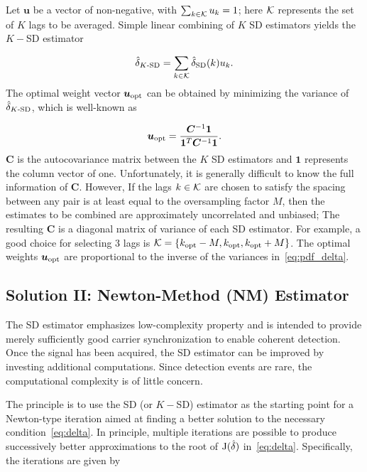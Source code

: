 Let $\bm{u}$ be a vector of non-negative, with
$\sum_{k \in {\cal K}}u_k=1$; here ${\cal K}$ represents the set of $K$
lags to be averaged.
Simple linear combining of $K$ SD estimators yields the $K-$SD estimator

\begin{equation}
  \label{eq:K_SD_est}
      \hat{\delta}_{K\text{-SD}}=\sum_{k \in \cal K}\hat{\delta}_{\text{SD}}(k)u_k.
\end{equation}
The optimal weight vector $\bm{u}_{\text{opt}}$ can be obtained by minimizing the variance of $\hat{\delta}_{K\text{-SD}}$,
which is well-known as

\begin{equation}
  \label{eq:u_opt}
      \bm{u}_{\text{opt}}=\frac{\bm{C}^{-1}\bm{1}}{\bm{1}^T\bm{C}^{-1}\bm{1}}.
\end{equation}
$\bm{C}$ is the autocovariance matrix between the $K$ SD estimators and $\bm{1}$ represents the column vector of one. 
Unfortunately, it is generally difficult to know the full information of $\bm{C}$. However,
If the lags $k \in {\cal K}$ are chosen to satisfy the spacing between any pair is at least
equal to the oversampling factor $M$, then the estimates to be combined are approximately uncorrelated and unbiased; The  
resulting $\bm{C}$ is a diagonal matrix of variance of each SD estimator. For example, a good choice for selecting 3 lags is 
${\cal K}=\{k_{\text{opt}}-M,k_{\text{opt}},k_{\text{opt}}+M\}$. The optimal weights $\bm{u}_{\text{opt}}$ are proportional to the inverse of the
variances in~\eqref{eq:pdf_delta}.

\subsection{Solution II: Newton-Method (NM) Estimator}

The SD estimator emphasizes low-complexity property and is intended to provide merely sufficiently good carrier synchronization
to enable coherent detection. Once the signal has been acquired, the SD estimator can be improved by 
investing additional computations. Since detection events are rare, the computational complexity is of little concern.

The principle is to use the SD (or $K-$SD) estimator as the starting point for a Newton-type iteration 
aimed at finding a better solution to the necessary condition~\eqref{eq:delta}. 
In principle, multiple iterations are possible to produce successively better approximations to the root of
$\mathrm{J}(\hat{\delta})$ in~\eqref{eq:delta}. Specifically, the iterations are given by

